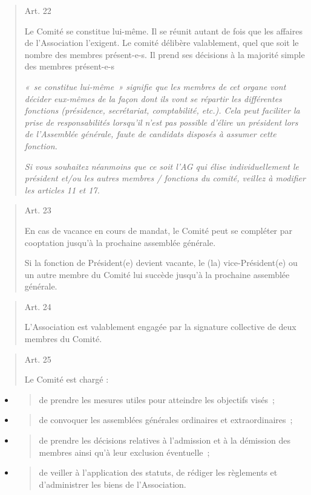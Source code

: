 \documentclass[10pt]{article}
\begin{document}
\begin{quote}
Art. 22

Le Comité se constitue lui-même. Il se réunit autant de fois que les
affaires de l'Association l'exigent. Le comité délibère valablement,
quel que soit le nombre des membres présent-e-s. Il prend ses décisions
à la majorité simple des membres présent-e-s

\emph{«~se constitue lui-même~» signifie que les membres de cet organe
vont décider eux-mêmes de la façon dont ils vont se répartir les
différentes fonctions (présidence, secrétariat, comptabilité, etc.).
Cela peut faciliter la prise de responsabilités lorsqu'il n'est pas
possible d'élire un président lors de l'Assemblée générale, faute de
candidats disposés à assumer cette fonction.}

\emph{Si vous souhaitez néanmoins que ce soit l'AG qui élise
individuellement le président et/ou les autres membres / fonctions du
comité, veillez à modifier les articles 11 et 17.}

\end{quote}
\begin{quote}
Art. 23~~~

En cas de vacance en cours de mandat, le Comité peut se compléter par
cooptation jusqu'à la prochaine assemblée générale.

Si la fonction de Président(e) devient vacante, le (la)
vice-Président(e) ou un autre membre du Comité lui succède jusqu'à la
prochaine assemblée générale.

\end{quote}
\begin{quote}
Art. 24

L'Association est valablement engagée par la signature collective de
deux membres du Comité.

\end{quote}
\begin{quote}
Art. 25

Le Comité est chargé :
\end{quote}

\begin{itemize}
\item
  \begin{quote}
  de prendre les mesures utiles pour atteindre les objectifs visés~;
  \end{quote}
\item
  \begin{quote}
  de convoquer les assemblées générales ordinaires et extraordinaires~;
  \end{quote}
\item
  \begin{quote}
  de prendre les décisions relatives à l'admission et à la démission des
  membres ainsi qu'à leur exclusion éventuelle~;
  \end{quote}
\item
  \begin{quote}
  de veiller à l'application des statuts, de rédiger les règlements et
  d'administrer les biens de l'Association.
  \end{quote}
\end{itemize}
\end{document}
